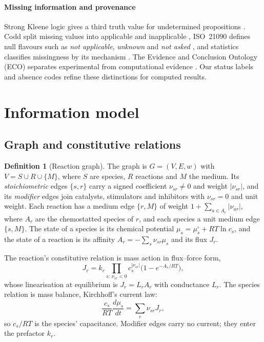 \documentclass[5p]{elsarticle}
\theoremstyle{definition}
\newtheorem{definition}{Definition}
\theoremstyle{plain}
\begin{document}
\paragraph{Missing information and provenance}
Strong Kleene logic gives a third truth value for undetermined propositions \citep{kleene1952introduction}.
Codd split missing values into applicable and inapplicable \citep{codd1986missing}, ISO~21090 defines null flavours such as \emph{not applicable}, \emph{unknown} and \emph{not asked} \citep{iso21090}, and statistics classifies missingness by its mechanism \citep{rubin1976inference}.
The Evidence and Conclusion Ontology (ECO) separates experimental from computational evidence \citep{giglio2019eco}.
Our status labels and absence codes refine these distinctions for computed results.

\section{Information model}
\label{sec:model}

\subsection{Graph and constitutive relations}
\label{sec:graph}

\begin{definition}[Reaction graph]
\label{def:ckg}
The graph is $G=(V,E,w)$ with $V=S\cup R\cup\{M\}$, where $S$ are species, $R$ reactions and $M$ the medium.
Its \emph{stoichiometric} edges $\{s,r\}$ carry a signed coefficient $\nu_{sr}\neq0$ and weight $|\nu_{sr}|$, and its \emph{modifier} edges join catalysts, stimulators and inhibitors with $\nu_{sr}=0$ and unit weight.
Each reaction has a medium edge $\{r,M\}$ of weight $1+\sum_{a\in A_r}|\nu_{ar}|$, where $A_r$ are the chemostatted species of $r$, and each species a unit medium edge $\{s,M\}$.
The state of a species is its chemical potential $\mu_s=\mu_s^\circ+RT\ln c_s$, and the state of a reaction is its affinity $A_r=-\sum_s\nu_{sr}\mu_s$ and its flux $J_r$.
\end{definition}

The reaction's constitutive relation is mass action in flux--force form,
\begin{equation}
  J_r = k_r \prod_{s:\,\nu_{sr}<0} c_s^{|\nu_{sr}|}\bigl(1-e^{-A_r/RT}\bigr),
  \label{eq:junction}
\end{equation}
whose linearisation at equilibrium is $J_r=L_rA_r$ with conductance $L_r$.
The species relation is mass balance, Kirchhoff's current law:
\begin{equation}
  \frac{c_s}{RT}\frac{d\mu_s}{dt}=\sum_r\nu_{sr}J_r,
  \label{eq:node}
\end{equation}
so $c_s/RT$ is the species' capacitance.
Modifier edges carry no current; they enter the prefactor $k_r$.
\end{document}
